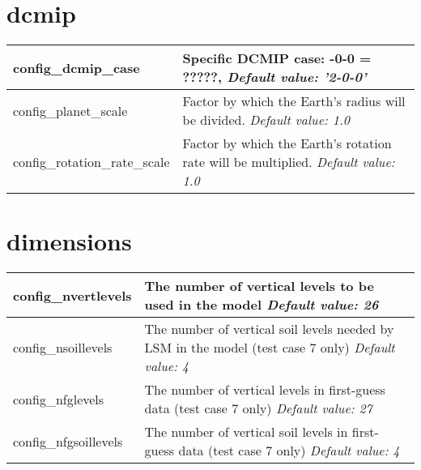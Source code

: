 \section{dcmip}

{\small
\begin{longtable}{|p{1.5in} |p{4.75in}|}
 \hline
   config\_dcmip\_case & Specific DCMIP case: \newline
                                        2-0-0 = ?????, \newline
                                         {\em Default value: '2-0-0'} \\ \hline
                                        
   config\_planet\_scale & Factor by which the Earth's radius will be divided. \newline 
   {\em Default value: 1.0} \\ \hline
                                      
   config\_rotation\_rate\_scale & Factor by which the Earth's rotation rate will be multiplied. \newline 
   {\em Default value: 1.0} \\ \hline   
   
\end{longtable}
}


\section{dimensions}

{\small
\begin{longtable}{|p{1.25in} |p{5.0in}|}
 \hline
   config\_nvertlevels     & The number of vertical levels to be used in the model \newline 
   {\em Default value: 26} \\ \hline
   
   config\_nsoillevels     & The number of vertical soil levels needed by LSM in the model (test case 7 only) \newline 
   {\em Default value: 4} \\ \hline
   
   config\_nfglevels       & The number of vertical levels in first-guess data (test case 7 only) \newline 
   {\em Default value: 27} \\ \hline
   
   config\_nfgsoillevels   & The number of vertical soil levels in first-guess data (test case 7 only) \newline 
   {\em Default value: 4} \\ \hline
\end{longtable}
}

